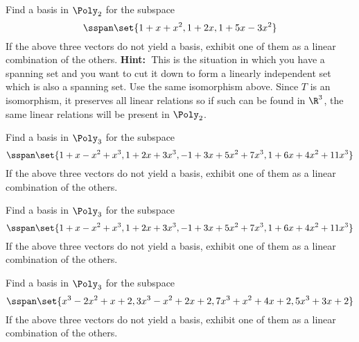 \begin{enumialphparenastyle}
\begin{ex} Find a basis in $\Poly_{2}$ for the subspace 
\begin{equation*}
\sspan\set{1+x+x^{2},1+2x,1+5x-3x^{2}}
\end{equation*}
If the above three vectors do not yield a basis, exhibit one of them as a
linear combination of the others. \textbf{Hint:\ }This is the situation in
which you have a spanning set and you want to cut it down to form a linearly
independent set which is also a spanning set. Use the same isomorphism
above. Since $T$ is an isomorphism, it preserves all linear relations so if
such can be found in $\R^{3}$, the same linear relations will be
present in $\Poly_{2}$.
\end{ex}


\begin{ex} Find a basis in $\Poly_{3}$ for the subspace 
\begin{equation*}
\sspan\set{
1+x-x^{2}+x^{3},1+2x+3x^{3},-1+3x+5x^{2}+7x^{3},1+6x+4x^{2}+11x^{3}}
\end{equation*}
If the above three vectors do not yield a basis, exhibit one of them as a
linear combination of the others.
\end{ex}


\begin{ex} Find a basis in $\Poly_{3}$ for the subspace 
\begin{equation*}
\sspan\set{
1+x-x^{2}+x^{3},1+2x+3x^{3},-1+3x+5x^{2}+7x^{3},1+6x+4x^{2}+11x^{3}}
\end{equation*}
If the above three vectors do not yield a basis, exhibit one of them as a
linear combination of the others.
\end{ex}


\begin{ex} Find a basis in $\Poly_{3}$ for the subspace 
\begin{equation*}
\sspan\set{
x^{3}-2x^{2}+x+2,3x^{3}-x^{2}+2x+2,7x^{3}+x^{2}+4x+2,5x^{3}+3x+2}
\end{equation*}
If the above three vectors do not yield a basis, exhibit one of them as a
linear combination of the others.
\end{ex}



\end{enumialphparenastyle}
